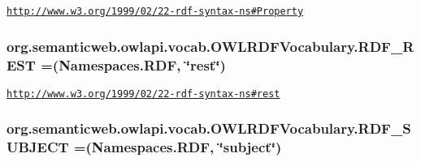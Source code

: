 \href{http://www.w3.org/1999/02/22-rdf-syntax-ns#Property}{\tt http\-://www.\-w3.\-org/1999/02/22-\/rdf-\/syntax-\/ns\#\-Property} \hypertarget{enumorg_1_1semanticweb_1_1owlapi_1_1vocab_1_1_o_w_l_r_d_f_vocabulary_a2679f9e990891d82d82166a3bc70aeb9}{
\subsubsection[{R\-D\-F\-\_\-\-R\-E\-S\-T}]{\setlength{\rightskip}{0pt plus 5cm}org.\-semanticweb.\-owlapi.\-vocab.\-O\-W\-L\-R\-D\-F\-Vocabulary.\-R\-D\-F\-\_\-\-R\-E\-S\-T =({\bf Namespaces.\-R\-D\-F}, \char`\"{}rest\char`\"{})}}\label{enumorg_1_1semanticweb_1_1owlapi_1_1vocab_1_1_o_w_l_r_d_f_vocabulary_a2679f9e990891d82d82166a3bc70aeb9}
\href{http://www.w3.org/1999/02/22-rdf-syntax-ns#rest}{\tt http\-://www.\-w3.\-org/1999/02/22-\/rdf-\/syntax-\/ns\#rest} \hypertarget{enumorg_1_1semanticweb_1_1owlapi_1_1vocab_1_1_o_w_l_r_d_f_vocabulary_abb3d8eceeb4eaffca62361e20318f290}{
\subsubsection[{R\-D\-F\-\_\-\-S\-U\-B\-J\-E\-C\-T}]{\setlength{\rightskip}{0pt plus 5cm}org.\-semanticweb.\-owlapi.\-vocab.\-O\-W\-L\-R\-D\-F\-Vocabulary.\-R\-D\-F\-\_\-\-S\-U\-B\-J\-E\-C\-T =({\bf Namespaces.\-R\-D\-F}, \char`\"{}subject\char`\"{})}}\label{enumorg_1_1semanticweb_1_1owlapi_1_1vocab_1_1_o_w_l_r_d_f_vocabulary_abb3d8eceeb4eaffca62361e20318f290}
